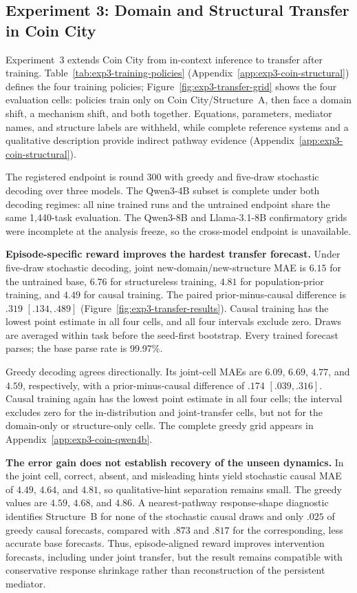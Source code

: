 \subsection{Experiment 3: Domain and Structural Transfer in Coin City}
\label{sec:exp3}

Experiment~3 extends Coin City from in-context inference to transfer after
training. Table~\ref{tab:exp3-training-policies} (Appendix~\ref{app:exp3-coin-structural})
defines the four training policies; Figure~\ref{fig:exp3-transfer-grid} shows the
four evaluation cells:
policies train only on Coin City/Structure~A, then face a domain shift, a
mechanism shift, and both together. Equations, parameters, mediator names, and
structure labels are withheld, while complete reference systems and a qualitative
description provide indirect pathway evidence
(Appendix~\ref{app:exp3-coin-structural}).

The registered endpoint is round 300 with greedy and five-draw stochastic
decoding over three models. The Qwen3-4B subset is complete under both
decoding regimes: all nine trained runs and the untrained endpoint share the same
1,440-task evaluation. The Qwen3-8B and Llama-3.1-8B confirmatory grids were
incomplete at the analysis freeze, so the cross-model endpoint is unavailable.



\textbf{Episode-specific reward improves the hardest transfer forecast.}
Under five-draw stochastic decoding, joint new-domain/new-structure MAE is $6.15$
for the untrained base, $6.76$ for structureless training, $4.81$ for
population-prior training, and $4.49$ for causal training. The paired
prior-minus-causal difference is $.319$ $[.134,.489]$
(Figure~\ref{fig:exp3-transfer-results}). Causal training has the lowest point
estimate in all four cells, and all four intervals exclude zero. Draws are
averaged within task before the seed-first bootstrap. Every trained forecast
parses; the base parse rate is 99.97\%.

Greedy decoding agrees directionally. Its joint-cell MAEs are $6.09$, $6.69$,
$4.77$, and $4.59$, respectively, with a prior-minus-causal difference of $.174$
$[.039,.316]$. Causal training again has the lowest point estimate in all four
cells; the interval excludes zero for the in-distribution and joint-transfer
cells, but not for the domain-only or structure-only cells. The complete greedy
grid appears in Appendix~\ref{app:exp3-coin-qwen4b}.

\textbf{The error gain does not establish recovery of the unseen dynamics.}
In the joint cell, correct, absent, and misleading hints yield stochastic
causal MAE of $4.49$, $4.64$, and $4.81$, so qualitative-hint separation remains
small. The greedy values are $4.59$, $4.68$, and $4.86$. A nearest-pathway
response-shape diagnostic identifies Structure~B for none of the stochastic
causal draws and only $.025$ of greedy causal forecasts, compared with $.873$ and
$.817$ for the corresponding, less accurate base forecasts. Thus,
episode-aligned reward improves intervention forecasts, including under joint
transfer, but the result remains compatible with conservative response shrinkage
rather than reconstruction of the persistent mediator.

